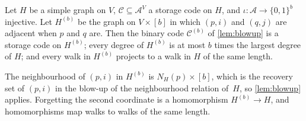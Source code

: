 \begin{lemma}\label{lem:graphblowup}
Let $H$ be a simple graph on $V$, $\mathcal C\subseteq\mathcal A^V$ a storage code on $H$, and
$\iota\colon\mathcal A\to\{0,1\}^b$ injective. Let $H^{(b)}$ be the graph on $V\times[b]$ in which $(p,i)$ and $(q,j)$
are adjacent when $p$ and $q$ are. Then the binary code $\mathcal C^{(b)}$ of \cref{lem:blowup} is a storage code on
$H^{(b)}$; every degree of $H^{(b)}$ is at most $b$ times the largest degree of $H$; and every walk in $H^{(b)}$ projects
to a walk in $H$ of the same length.
\end{lemma}
\begin{outline}
The neighbourhood of $(p,i)$ in $H^{(b)}$ is $N_H(p)\times[b]$, which is the recovery set of $(p,i)$ in the blow-up of
the neighbourhood relation of~$H$, so \cref{lem:blowup} applies. Forgetting the second coordinate is a homomorphism
$H^{(b)}\to H$, and homomorphisms map walks to walks of the same length.
\end{outline}

